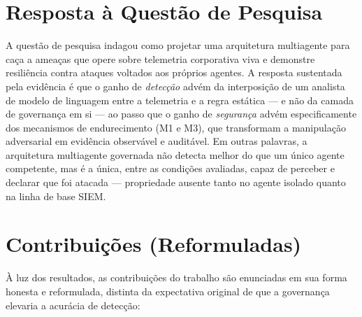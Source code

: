 \section{Resposta à Questão de Pesquisa}
\label{sec:concl-resposta}

A questão de pesquisa indagou como projetar uma arquitetura multiagente para caça
a ameaças que opere sobre telemetria corporativa viva e demonstre resiliência
contra ataques voltados aos próprios agentes. A resposta sustentada pela evidência
é que o ganho de \emph{detecção} advém da interposição de um analista de modelo de
linguagem entre a telemetria e a regra estática --- e não da camada de governança
em si --- ao passo que o ganho de \emph{segurança} advém especificamente dos
mecanismos de endurecimento (M1 e M3), que transformam a manipulação adversarial
em evidência observável e auditável. Em outras palavras, a arquitetura multiagente
governada não detecta melhor do que um único agente competente, mas é a única,
entre as condições avaliadas, capaz de perceber e declarar que foi atacada ---
propriedade ausente tanto no agente isolado quanto na linha de base SIEM.

\section{Contribuições (Reformuladas)}
\label{sec:concl-contribuicoes}

À luz dos resultados, as contribuições do trabalho são enunciadas em sua forma
honesta e reformulada, distinta da expectativa original de que a governança
elevaria a acurácia de detecção:

